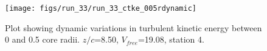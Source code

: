 \begin{figure}[H]
\centering
\texttt{[image: figs/run\_33/run\_33\_ctke\_005rdynamic]}
\caption{Plot showing dynamic variations in turbulent kinetic energy between 0 and 0.5 core radii. $z/c$=8.50, $V_{free}$=19.08, station 4.}
\label{fig:run_33_ctke_005rdynamic}
\end{figure}


